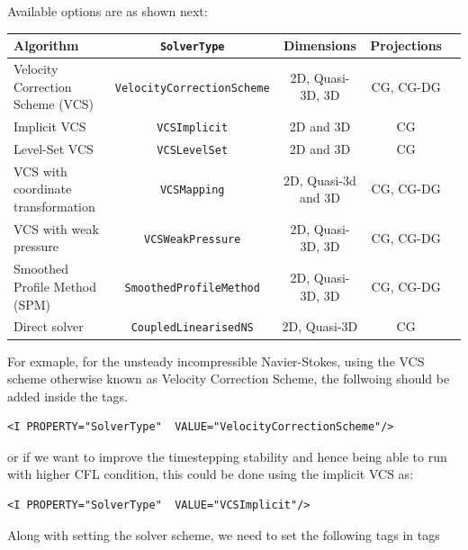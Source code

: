 Available options are as shown next:
\begin{center}
\footnotesize
\begin{tabular}{lcccc}
\toprule
{Algorithm} & {\texttt{SolverType}} &{Dimensions}&{Projections} \\
\midrule
Velocity Correction Scheme (VCS) & \texttt{VelocityCorrectionScheme} & 2D, Quasi-3D, 3D & CG, CG-DG\\
Implicit VCS & \texttt{VCSImplicit} & 2D and 3D & CG\\
Level-Set VCS & \texttt{VCSLevelSet} & 2D and 3D & CG\\
VCS with coordinate transformation & \texttt{VCSMapping} & 2D, Quasi-3d and 3D & CG, CG-DG\\
VCS with weak pressure & \texttt{VCSWeakPressure} & 2D, Quasi-3D, 3D & CG, CG-DG\\
Smoothed Profile Method (SPM)    & \texttt{SmoothedProfileMethod}    & 2D, Quasi-3D, 3D & CG, CG-DG\\
Direct solver & \texttt{CoupledLinearisedNS} & 2D, Quasi-3D &CG\\
\bottomrule
\end{tabular}
\end{center}

For exmaple, for the unsteady incompressible Navier-Stokes, using the VCS scheme
otherwise known as Velocity Correction Scheme, the follwoing should be added 
inside the  tags.

\begin{lstlisting}[style=XMLStyle]
<I PROPERTY="SolverType"  VALUE="VelocityCorrectionScheme"/>
\end{lstlisting}

or if we want to improve the timestepping stability and hence being able to 
run with higher CFL condition, this could be done using the implicit VCS as:

\begin{lstlisting}[style=XMLStyle]
<I PROPERTY="SolverType"  VALUE="VCSImplicit"/>
\end{lstlisting}

Along with setting the solver scheme, we need to set the following tags in 
 tags


